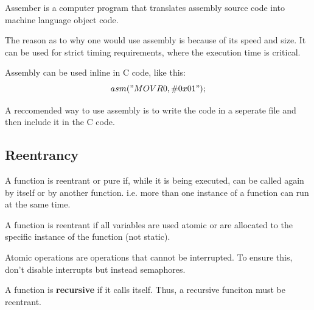 Assember is a computer program that translates assembly source code
into machine language object code.

The reason as to why one would use assembly is because of its speed and size.
It can be used for strict timing requirements, where the execution time
is critical.


Assembly can be used inline in C code, like this:
$$ asm("MOV R0, \#0x01"); $$

A reccomended way to use assembly is to write the code in a seperate
file and then include it in the C code.



\subsection{Reentrancy}

A function is reentrant or pure if, while it is being executed,
can be called again by itself or by another function.
i.e. more than one instance of a function can run at the same time.

A function is reentrant if all variables are used atomic
or are allocated to the specific instance of the function (not static).

Atomic operations are operations that cannot be interrupted.
To ensure this, don't disable interrupts but
instead semaphores.


A function is \textbf{recursive} if it calls itself.
Thus, a recursive funciton must be reentrant.
